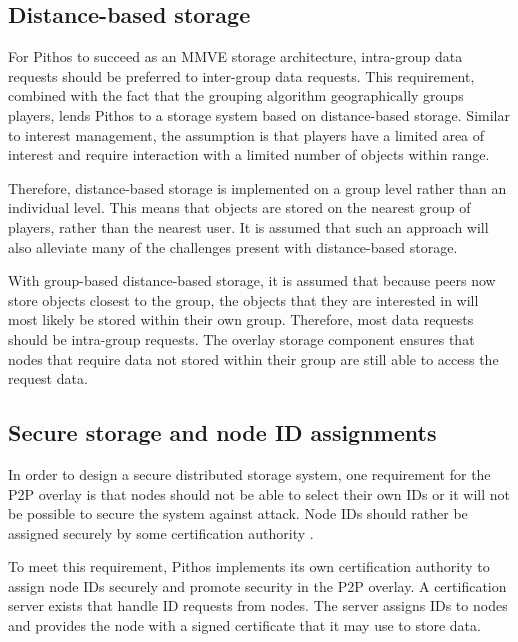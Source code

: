 \documentclass[10pt,a4paper,conference]{IEEEtran}
\begin{document}

\subsection{Distance-based storage}
\label{distance_based}

For Pithos to succeed as an MMVE storage architecture, intra-group data requests should be preferred to inter-group data requests. This requirement,
combined with the fact that the grouping algorithm geographically groups players, lends Pithos to a storage system based on distance-based storage.
Similar to interest management, the assumption is that players have a limited area of interest and require interaction with a limited number of
objects within range.

Therefore, distance-based storage is implemented on a group level rather than an individual level. This means that objects are stored on the nearest
group of players, rather than the nearest user. It is assumed that such an approach will also alleviate many of the challenges present with
distance-based storage.

With group-based distance-based storage, it is assumed that because peers now store objects closest to the group, the objects that they are
interested in will most likely be stored within their own group. Therefore, most data requests should be intra-group requests. The overlay storage
component ensures that nodes that require data not stored within their group are still able to access the request data.

\subsection{Secure storage and node ID assignments}
\label{secure_ids}

In order to design a secure distributed storage system, one requirement for the P2P overlay is that nodes should not be able to select their own IDs
or it will not be possible to secure the system against attack. Node IDs should rather be assigned securely by some certification authority
\cite{secure_overlay_routing}.

To meet this requirement, Pithos implements its own certification authority to assign node IDs securely and promote security in the P2P overlay. A
certification server exists that handle ID requests from nodes. The server assigns IDs to nodes and provides the node with a signed certificate that
it may use to store data.
\end{document}
